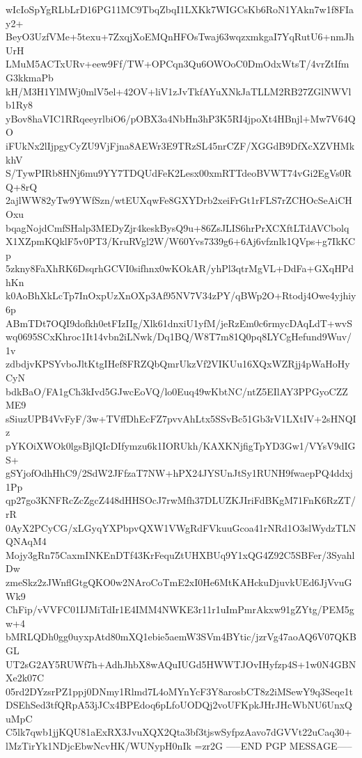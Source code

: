 wIcIoSpYgRLbLrD16PG11MC9TbqZbqI1LXKk7WIGCsKb6RoN1YAkn7w1f8FIay2+
BeyO3UzfVMe+5texu+7ZxqjXoEMQnHFOsTwaj63wqzxmkgaI7YqRutU6+nmJhUrH
LMuM5ACTxURv+eew9Ff/TW+OPCqn3Qu6OWOoC0DmOdxWtsT/4vrZtIfmG3kkmaPb
kH/M3H1YlMWj0mlV5el+42OV+liV1zJvTkfAYuXNkJaTLLM2RB27ZGlNWVlb1Ry8
yBov8haVIC1RRqeeyrlbiO6/pOBX3a4NbHn3hP3K5RI4jpoXt4HBnjl+Mw7V64QO
iFUkNx2lIjpgyCyZU9VjFjna8AEWr3E9TRzSL45nrCZF/XGGdB9DfXcXZVHMkkhV
S/TywPIRb8HNj6mu9YY7TDQUdFeK2Lesx00xmRTTdeoBVWT74vGi2EgVs0RQ+8rQ
2ajlWW82yTw9YWfSzn/wtEUXqwFe8GXYDrb2xeiFrGt1rFLS7rZCHOcSeAiCHOxu
bqagNojdCmfSHalp3MEDyZjr4keskBysQ9u+86ZsJLIS6hrPrXCXftLTdAVCbolq
X1XZpmKQklF5v0PT3/KruRVgl2W/W60Yvs7339g6+6Aj6vfznlk1QVps+g7IkKCp
5zkny8FaXhRK6DsqrhGCVI0sifhnx0wKOkAR/yhPl3qtrMgVL+DdFa+GXqHPdhKn
k0AoBhXkLcTp7InOxpUzXnOXp3Af95NV7V34zPY/qBWp2O+Rtodj4Owe4yjhiy6p
ABmTDt7OQI9dofkh0etFIzIIg/Xlk61dnxiU1yfM/jeRzEm0c6rmycDAqLdT+wvS
wq0695SCxKhroc1It14vbn2iLNwk/Dq1BQ/W8T7m81Q0pq8LYCgHefund9Wuv/1v
zdbdjvKPSYvboJltKtgIHef8FRZQbQmrUkzVf2VIKUu16XQxWZRjj4pWaHoHyCyN
bdkBaO/FA1gCh3kIvd5GJwcEoVQ/lo0Euq49wKbtNC/ntZ5EIlAY3PPGyoCZZME9
sSiuzUPB4VvFyF/3w+TVffDhEcFZ7pvvAhLtx5SSvBc51Gb3rV1LXtIV+2sHNQIz
pYKOiXWOk0lgsBjlQIcDIfymzu6k1IORUkh/KAXKNjfigTpYD3Gw1/VYsV9dIGS+
gSYjofOdhHhC9/2SdW2JFfzaT7NW+hPX24JYSUnJtSy1RUNH9fwaepPQ4ddxj1Pp
qp27go3KNFRcZcZgcZ448dHHSOcJ7rwMfh37DLUZKJIriFdBKgM71FnK6RzZT/rR
0AyX2PCyCG/xLGyqYXPbpvQXW1VWgRdFVkuuGcoa41rNRd1O3slWydzTLNQNAqM4
Mojy3gRn75CaxmINKEnDTf43KrFequZtUHXBUq9Y1xQG4Z92C5SBFer/3SyahlDw
zmeSkz2zJWnflGtgQKO0w2NAroCoTmE2xI0He6MtKAHckuDjuvkUEd6JjVvuGWk9
ChFip/vVVFC01IJMiTdIr1E4IMM4NWKE3r11r1uImPmrAkxw91gZYtg/PEM5gw+4
bMRLQDh0gg0uyxpAtd80mXQ1ebie5aemW3SVm4BYtic/jzrVg47aoAQ6V07QKBGL
UT2sG2AY5RUWf7h+AdhJhbX8wAQuIUGd5HWWTJOvIHyfzp4S+1w0N4GBNXe2k07C
05rd2DYzsrPZ1ppj0DNmy1Rlmd7L4oMYnYcF3Y8arosbCT8z2iMSewY9q3Seqe1t
DSEhSed3tfQRpA53jJCx4BPEdoq6pLfoUODQj2voUFKpkJHrJHcWbNU6UnxQuMpC
C5lk7qwb1jjKQU81aExRX3JvuXQX2Qta3bf3tjswSyfpzAavo7dGVVt22uCaq30+
lMzTirYk1NDjcEbwNcvHK/WUNypH0nIk
=zr2G
-----END PGP MESSAGE-----
